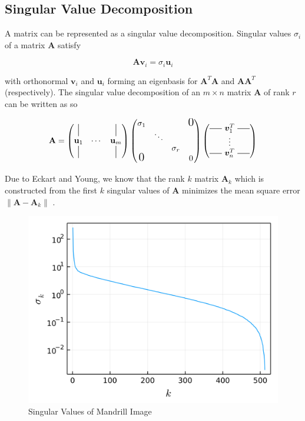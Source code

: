 \documentclass[conference]{IEEEtran}
\newcommand*{\vertbar}{\rule[-1ex]{0.5pt}{1.5em}}
\newcommand*{\horzbar}{\rule[0.5ex]{1.5em}{0.5pt}}
\begin{document}
\subsection{Singular Value Decomposition}

A matrix can be represented as a singular value decomposition.
Singular values $\sigma_i$ of a matrix $\mathbf{A}$ satisfy

\begin{equation}
    \mathbf{A}\mathbf{v}_i = \sigma_i\mathbf{u}_i
\end{equation}

with orthonormal $\mathbf{v}_i$ and $\mathbf{u}_i$ forming an eigenbasis for $\mathbf{A}^T\mathbf{A}$ and $\mathbf{AA}^T$ (respectively).
The singular value decomposition of an $m\times n$ matrix $\mathbf{A}$ of rank $r$ can be written as so

\begin{equation}
    \mathbf{A} = 
    \begin{pmatrix}
        \vertbar && \vertbar \\
        \mathbf{u}_1 & \cdots & \mathbf{u}_m \\
        \vertbar && \vertbar \\
    \end{pmatrix}
    \begin{pmatrix}
        \sigma_1 &&&\text{\Large0} \\ 
        & \ddots && \\
        && \sigma_r & \\
        \text{\Large0}&&& 0 \\
    \end{pmatrix}
    \begin{pmatrix}\horzbar~\bm{v}^T_1~\horzbar\\\vdots\\\horzbar~\bm{v}^T_n~\horzbar\end{pmatrix}
\end{equation}

Due to Eckart and Young, we know that the rank $k$ matrix $\mathbf{A}_k$ which is constructed from the first $k$ singular values of $\mathbf{A}$ minimizes the mean square error $\left\lVert\mathbf{A}-\mathbf{A}_k\right\rVert$ \cite{strang}.

\begin{figure}[htbp]
    \centering
    \includegraphics[width=0.7\columnwidth]{images/mandrill_SVD.png}
    \caption{Singular Values of Mandrill Image}
    \label{fig:svd}
\end{figure}
\end{document}
